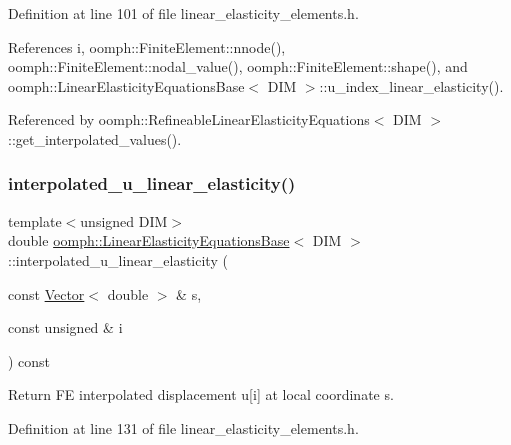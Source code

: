 Definition at line 101 of file linear\+\_\+elasticity\+\_\+elements.\+h.



References i, oomph\+::\+Finite\+Element\+::nnode(), oomph\+::\+Finite\+Element\+::nodal\+\_\+value(), oomph\+::\+Finite\+Element\+::shape(), and oomph\+::\+Linear\+Elasticity\+Equations\+Base$<$ D\+I\+M $>$\+::u\+\_\+index\+\_\+linear\+\_\+elasticity().



Referenced by oomph\+::\+Refineable\+Linear\+Elasticity\+Equations$<$ D\+I\+M $>$\+::get\+\_\+interpolated\+\_\+values().

\mbox{\label{classoomph_1_1LinearElasticityEquationsBase_a5e3f41d1c36a8ebc0a90ed7cbe230c75}} 
\subsubsection{\texorpdfstring{interpolated\+\_\+u\+\_\+linear\+\_\+elasticity()}{interpolated\_u\_linear\_elasticity()}\hspace{0.1cm}{\footnotesize\ttfamily [2/2]}}
{\footnotesize\ttfamily template$<$unsigned D\+IM$>$ \\
double \hyperlink{classoomph_1_1LinearElasticityEquationsBase}{oomph\+::\+Linear\+Elasticity\+Equations\+Base}$<$ D\+IM $>$\+::interpolated\+\_\+u\+\_\+linear\+\_\+elasticity (\begin{DoxyParamCaption}\item[{const \hyperlink{classoomph_1_1Vector}{Vector}$<$ double $>$ \&}]{s,  }\item[{const unsigned \&}]{i }\end{DoxyParamCaption}) const\hspace{0.3cm}{\ttfamily [inline]}}



Return FE interpolated displacement u\mbox{[}i\mbox{]} at local coordinate s. 



Definition at line 131 of file linear\+\_\+elasticity\+\_\+elements.\+h.



